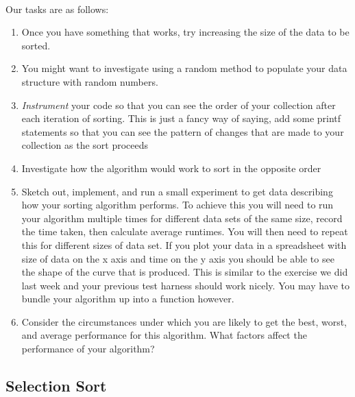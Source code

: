 \documentclass[10pt, a4paper, twosize]{article}
\begin{document}
\paragraph{} Our tasks are as follows:
\begin{enumerate}
\item Once you have something that works, try increasing the size of the data to be sorted.
\item You might want to investigate using a random method to populate your data structure with random numbers.
\item \emph{Instrument} your code so that you can see the order of your collection after each iteration of sorting. This is just a fancy way of saying, add some printf statements so that you can see the pattern of changes that are made to your collection as the sort proceeds
\item Investigate how the algorithm would work to sort in the opposite order
\item Sketch out, implement, and run a small experiment to get data describing how your sorting algorithm performs. To achieve this you will need to run your algorithm multiple times for different data sets of the same size, record the time taken, then calculate average runtimes. You will then need to repeat this for different sizes of data set. If you plot your data in a spreadsheet with size of data on the x axis and time on the y axis you should be able to see the shape of the curve that is produced. This is similar to the exercise we did last week and your previous test harness should work nicely. You may have to bundle your algorithm up into a function however.
\item Consider the circumstances under which you are likely to get the best, worst, and average performance for this algorithm. What factors affect the performance of your algorithm?
\end{enumerate}




\subsection{Selection Sort}
\end{document}
